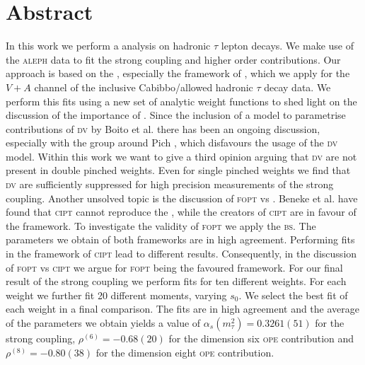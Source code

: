 \documentclass[../../index.tex]{subfiles}
\begin{document}
\chapter*{Abstract}
In this work we perform a  analysis on
hadronic \(\tau\) lepton decays. We make use of the \textsc{aleph} data to fit
the strong coupling and higher order 
contributions. Our approach is based on the , especially the framework of , which we apply for the \(V+A\) channel of the inclusive
Cabibbo\-/allowed hadronic \(\tau\) decay data. We perform this fits using a new
set of analytic weight functions to shed light on the discussion of the
importance of . Since the inclusion of a model to
parametrise contributions of \textsc{dv} by Boito et al. \cite{2011a} there has
been an ongoing discussion, especially with the group around Pich
\cite{Pich2016}, which disfavours the usage of the \textsc{dv} model. Within
this work we want to give a third opinion arguing that \textsc{dv} are not
present in double pinched weights. Even for single pinched weights we find that
\textsc{dv} are sufficiently suppressed for high precision measurements of the
strong coupling. Another unsolved topic is the discussion of \textsc{fopt} vs
. Beneke et al.
\cite{Beneke2008} have found that \textsc{cipt} cannot reproduce the
, while the creators of \textsc{cipt}
\cite{Pivovarov1991, Pich1992} are in favour of the framework. To investigate
the validity of \textsc{fopt} we apply the \textsc{bs}. The parameters we obtain
of both frameworks are in high agreement. Performing fits in the framework of
\textsc{cipt} lead to different results. Consequently, in the discussion of
\textsc{fopt} vs \textsc{cipt} we argue for \textsc{fopt} being the favoured
framework. For our final result of the strong coupling we perform fits for ten
different weights. For each weight we further fit 20 different moments, varying
\(s_0\). We select the best fit of each weight in a final comparison. The fits
are in high agreement and the average of the parameters we obtain yields a value
of \(\alpha_s(m_\tau^2) = 0.3261(51) \) for the strong coupling, \(\rho^{(6)} =
-0.68(20)\) for the dimension six \textsc{ope} contribution and \(\rho^{(8)} =
-0.80(38) \) for the dimension eight \textsc{ope} contribution.
\end{document}
